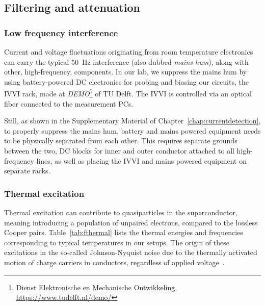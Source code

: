 \subsection{Filtering and attenuation}

\subsubsection{Low frequency interference}

Current and voltage fluctuations originating from room temperature electronics can carry the typical \SI{50}{\hertz} interference (also dubbed \textit{mains hum}), along with other, high-frequency, components.
%
In our lab, we suppress the mains hum by using battery-powered DC electronics for probing and biasing our circuits, the IVVI rack, made at \textit{DEMO}\footnote{Dienst Elektronische en Mechanische Ontwikkeling, \url{https://www.tudelft.nl/demo/}} of TU Delft.
%
The IVVI is controlled via an optical fiber connected to the measurement PCs.

Still, as shown in the Supplementary Material of Chapter~\ref{chap:currentdetection}, to properly suppress the mains hum, battery and mains powered equipment needs to be physically separated from each other.
%
This requires separate grounds between the two, DC blocks for inner and outer conductor attached to all high-frequency lines, as well as placing the IVVI and mains powered equipment on separate racks.

\subsubsection{Thermal excitation}

Thermal excitation can contribute to quasiparticles in the superconductor, meaning introducing a population of unpaired electrons, compared to the lossless Cooper pairs.
%
Table~\ref{tab:fthermal} lists the thermal energies and frequencies corresponding to typical temperatures in our setups.
%
The origin of these excitations in the so-called Johnson-Nyquist noise due to the thermally activated motion of charge carriers in conductors, regardless of applied voltage~\cite{johnsonThermalAgitationElectricity1928,nyquistThermalAgitationElectric1928}.


